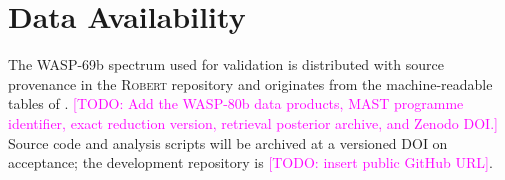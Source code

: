 \documentclass[fleqn,usenatbib]{mnras}
\newcommand{\ROBERT}{\textsc{Robert}}
\newcommand{\roberttodo}[1]{\textcolor{magenta}{[TODO: #1]}}
\begin{document}
\section*{Data Availability}
The WASP-69b spectrum used for validation is distributed with source provenance
in the \ROBERT{} repository and originates from the machine-readable tables of
\citet{Schlawin2024}. \roberttodo{Add the WASP-80b data products, MAST programme
identifier, exact reduction version, retrieval posterior archive, and Zenodo
DOI.} Source code and analysis scripts will be archived at a versioned DOI on
acceptance; the development repository is \roberttodo{insert public GitHub URL}.




\label{lastpage}
\end{document}
